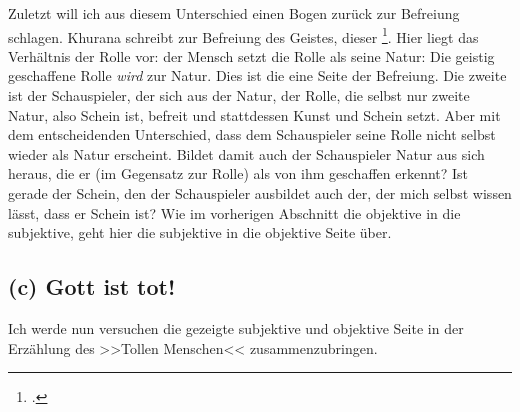 \documentclass[12pt, a4paper, openany]{report}
\begin{document}
Zuletzt will ich aus diesem Unterschied einen Bogen zurück zur Befreiung schlagen.
Khurana schreibt zur Befreiung des Geistes, dieser \footcite[][393]{khurana_freiheit_2017}. 
Hier liegt das Verhältnis der Rolle vor: 
der Mensch setzt die Rolle als seine Natur:
Die geistig geschaffene Rolle \emph{wird} zur Natur. 
Dies ist die eine Seite der Befreiung. 
Die zweite ist der Schauspieler, der sich aus der Natur, der Rolle, die selbst nur zweite Natur, also Schein ist, befreit und stattdessen Kunst und Schein setzt. 
Aber mit dem entscheidenden Unterschied, dass dem Schauspieler seine Rolle nicht selbst wieder als Natur erscheint. 
Bildet damit auch der Schauspieler Natur aus sich heraus, die er (im Gegensatz zur Rolle) als von ihm geschaffen erkennt? 
Ist gerade der Schein, den der Schauspieler ausbildet auch der, der mich selbst wissen lässt, dass er Schein ist?
Wie im vorherigen Abschnitt die objektive in die subjektive, geht hier die subjektive in die objektive Seite über.

\subsection{(c) Gott ist tot!}\label{abschnitt_2_3}
Ich werde nun versuchen die gezeigte subjektive und objektive Seite in der Erzählung des >>Tollen Menschen<< zusammenzubringen.
\end{document}
